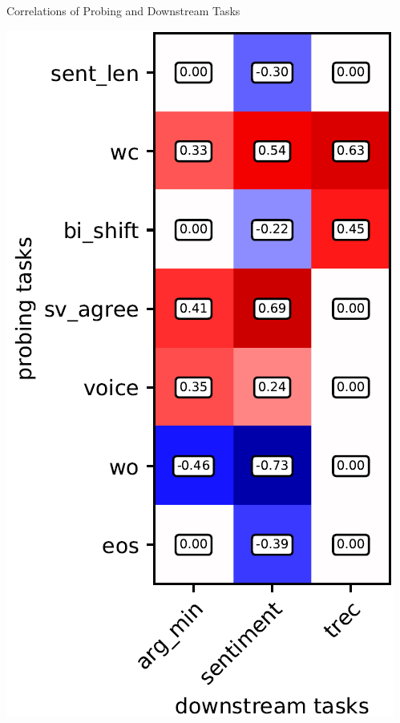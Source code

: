 \documentclass[accentcolor=tud1a,colorbacktitle,inverttitle,landscape,german,presentation,t]{tudbeamer}
\begin{document}
\begin{frame}{Correlations of Probing and Downstream Tasks}{}
	\vspace*{-4mm}
	\begin{minipage}{0.29\textwidth}
		\begin{center}
			\includegraphics[scale=0.25]{images/spearman_corr_ka_f1}
		\end{center}
	\end{minipage}
	\hfill
	\begin{minipage}{0.69\textwidth}
		\begin{itemize}\setlength\itemsep{1em}

\end{itemize}
\end{minipage}
\end{frame}
\end{document}
